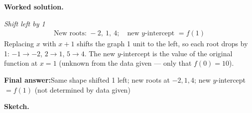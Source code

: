 \documentclass[11pt]{article}
\begin{document}
\textbf{Worked solution.}

\textit{Shift left by 1}
\[\begin{gathered}
\text{New roots: } -2,\ 1,\ 4; \quad \text{new }y\text{-intercept } = f(1)
\end{gathered}\]
Replacing \( x \) with \( x + 1 \) shifts the graph 1 unit to the left, so each root drops by 1: \( -1 \to -2 \), \( 2 \to 1 \), \( 5 \to 4 \). The new \( y \)-intercept is the value of the original function at \( x = 1 \) (unknown from the data given --- only that \( f(0) = 10 \)).

\begin{answerbox}
\textbf{Final answer:}\quad Same shape shifted 1 left; new roots at \(\displaystyle -2, 1, 4\); new \(\displaystyle y\)-intercept \(\displaystyle = f(1)\) (not determined by data given)
\end{answerbox}
\textbf{Sketch.}
\end{document}
